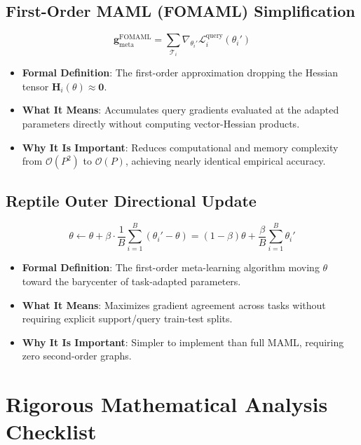 \documentclass[11pt,a4paper]{article}
\theoremstyle{definition}
\begin{document}
\subsection{First-Order MAML (FOMAML) Simplification}
{\boldmath
\begin{equation}
\mathbf{g}_{\text{meta}}^{\text{FOMAML}} = \sum_{\mathcal{T}_i} \nabla_{\theta_i'} \mathcal{L}_i^{\text{query}}(\theta_i')
\end{equation}
}
\begin{itemize}
    \item \textbf{Formal Definition}: The first-order approximation dropping the Hessian tensor $\mathbf{H}_i(\theta) \approx \mathbf{0}$.
    \item \textbf{What It Means}: Accumulates query gradients evaluated at the adapted parameters directly without computing vector-Hessian products.
    \item \textbf{Why It Is Important}: Reduces computational and memory complexity from $\mathcal{O}(P^2)$ to $\mathcal{O}(P)$, achieving nearly identical empirical accuracy.
\end{itemize}

\subsection{Reptile Outer Directional Update}
{\boldmath
\begin{equation}
\theta \gets \theta + \beta \cdot \frac{1}{B} \sum_{i=1}^B (\theta_i' - \theta) = (1 - \beta)\theta + \frac{\beta}{B}\sum_{i=1}^B \theta_i'
\end{equation}
}
\begin{itemize}
    \item \textbf{Formal Definition}: The first-order meta-learning algorithm moving $\theta$ toward the barycenter of task-adapted parameters.
    \item \textbf{What It Means}: Maximizes gradient agreement across tasks without requiring explicit support/query train-test splits.
    \item \textbf{Why It Is Important}: Simpler to implement than full MAML, requiring zero second-order graphs.
\end{itemize}

\section{Rigorous Mathematical Analysis Checklist}
\end{document}
